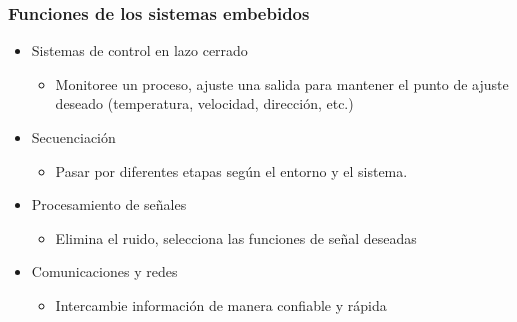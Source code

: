 \documentclass[10.5pt,scale=1.0,t,aspectratio=169,hyperref={pdfpagelabels=false}]{beamer}
\begin{document}
\begin{frame}
	\frametitle{Funciones de los sistemas embebidos}
	\begin{itemize}
		\item \textcolor{BlueLight}{Sistemas de control en lazo cerrado} 
		\begin{itemize}
			\item Monitoree un proceso, ajuste una salida para mantener el punto de ajuste deseado (temperatura, velocidad, dirección, etc.)
		\end{itemize}
		\item \textcolor{BlueLight}{Secuenciación} 
		\begin{itemize}
			\item Pasar por diferentes etapas según el entorno y el sistema.
		\end{itemize}
		\item \textcolor{BlueLight}{Procesamiento de señales} 
		\begin{itemize}
			\item Elimina el ruido, selecciona las funciones de señal deseadas
		\end{itemize}
		\item \textcolor{BlueLight}{Comunicaciones y redes} 
		\begin{itemize}
			\item Intercambie información de manera confiable y rápida
		\end{itemize}
	\end{itemize}	
\end{frame}
%	
%	
\end{document}
